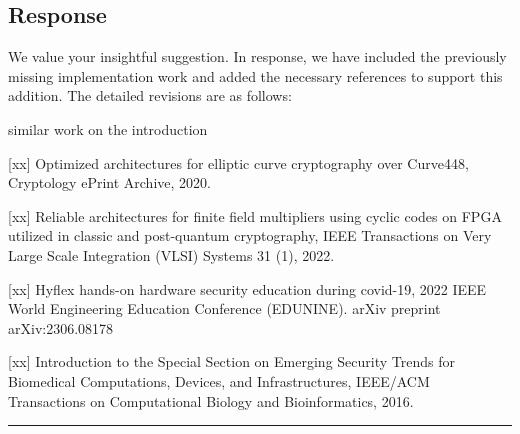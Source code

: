 \subsection{Response}

We value your insightful suggestion. In response, we have included the previously missing implementation work and added the necessary references to support this addition. The detailed revisions are as follows:

\color{blue}

similar work on the introduction

[xx] Optimized architectures for elliptic curve cryptography over Curve448, Cryptology ePrint Archive, 2020.

[xx] Reliable architectures for finite field multipliers using cyclic codes on FPGA utilized in classic and post-quantum cryptography, IEEE Transactions on Very Large Scale Integration (VLSI) Systems 31 (1), 2022.

[xx] Hyflex hands-on hardware security education during covid-19, 2022 IEEE World Engineering Education Conference (EDUNINE).
arXiv preprint arXiv:2306.08178

[xx] Introduction to the Special Section on Emerging Security Trends for Biomedical Computations, Devices, and Infrastructures, IEEE/ACM Transactions on Computational Biology and Bioinformatics, 2016.


\color{black}

\noindent\rule{\linewidth}{6.0pt}